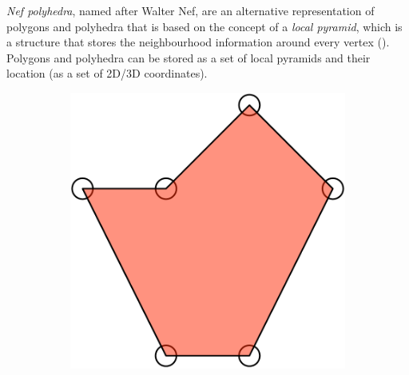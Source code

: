 \emph{Nef polyhedra}, named after Walter Nef, are an alternative representation of polygons and polyhedra that is based on the concept of a \emph{local pyramid}, which is a structure that stores the neighbourhood information around every vertex ().
Polygons and polyhedra can be stored as a set of local pyramids and their location (as a set of 2D/3D coordinates).

\begin{figure}
\centering
\begin{subfigure}[b]{0.5\linewidth}
\includegraphics[width=\linewidth]{figs/nef-1}
\caption{}%
\end{subfigure}
\begin{subfigure}[b]{0.35\linewidth}

\end{subfigure}
\end{figure}
